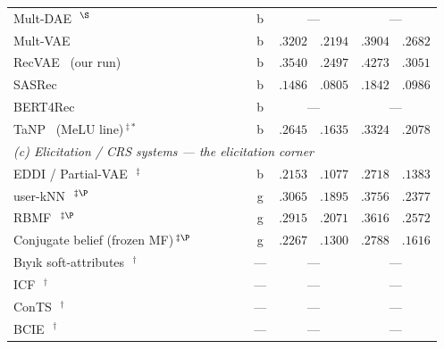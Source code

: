 \documentclass[11pt]{article}
\newcommand{\cmark}{\ding{51}}
\newcommand{\xmark}{\ding{55}}
\begin{document}
\begin{table}[!htbp]
\begin{tabular}{p{4.9cm}cccc c r@{\,/\,}l r@{\,/\,}l}
Mult-DAE~\cite{liang2018variational}\,$^{\S}$ & \cmark & \xmark & \xmark & \xmark & b & \multicolumn{2}{c}{---} & \multicolumn{2}{c}{---} \\
Mult-VAE~\cite{liang2018variational} & \cmark & \xmark & \xmark & \xmark & b & $.3202$ & $.2194$ & $.3904$ & $.2682$ \\
RecVAE~\cite{ren2020recvae} (our run) & \cmark & \xmark & \xmark & \xmark & b & $\mathbf{.3540}$ & $\mathbf{.2497}$ & $\mathbf{.4273}$ & $\mathbf{.3051}$ \\
SASRec~\cite{kang2018sasrec} & \xmark & \xmark & \xmark & \xmark & b & $.1486$ & $.0805$ & $.1842$ & $.0986$ \\
BERT4Rec~\cite{sun2019bert4rec} & \xmark & \xmark & \xmark & \xmark & b & \multicolumn{2}{c}{---} & \multicolumn{2}{c}{---} \\
TaNP~\cite{lin2021tanp} (MeLU line)\,$^{\ddagger\ast}$ & \xmark & \xmark & \xmark & \cmark & b & $.2645$ & $.1635$ & $.3324$ & $.2078$ \\
\midrule
\multicolumn{10}{l}{\emph{(c) Elicitation / CRS systems --- the elicitation corner}}\\
EDDI / Partial-VAE~\cite{ma2019eddi}\,$^{\ddagger}$ & \xmark & \xmark & \xmark & \cmark & b & $.2153$ & $.1077$ & $.2718$ & $.1383$ \\
user-kNN~\cite{golbandi2011adaptive}\,$^{\ddagger\P}$ & \xmark & \xmark & \xmark & \cmark & g & $.3065$ & $.1895$ & $.3756$ & $.2377$ \\
RBMF~\cite{liu2011wisdom,zhou2011functional}\,$^{\ddagger\P}$ & \xmark & \xmark & \xmark & \cmark & g & $.2915$ & $.2071$ & $.3616$ & $.2572$ \\
Conjugate belief (frozen MF)\,$^{\ddagger\P}$ & \xmark & \xmark & \xmark & \cmark & g & $.2267$ & $.1300$ & $.2788$ & $.1616$ \\
B\i y\i k soft-attributes~\cite{biyik2023soft}\,$^{\dagger}$ & \xmark & \xmark & \xmark & \cmark & --- & \multicolumn{2}{c}{---} & \multicolumn{2}{c}{---} \\
ICF~\cite{zhao2013interactive}\,$^{\dagger}$ & \xmark & \xmark & \xmark & \cmark & --- & \multicolumn{2}{c}{---} & \multicolumn{2}{c}{---} \\
ConTS~\cite{li2021seamlessly}\,$^{\dagger}$ & \xmark & \xmark & \xmark & \xmark & --- & \multicolumn{2}{c}{---} & \multicolumn{2}{c}{---} \\
BCIE~\cite{toroghi2023bcie}\,$^{\dagger}$ & \xmark & \xmark & \cmark & \xmark & --- & \multicolumn{2}{c}{---} & \multicolumn{2}{c}{---} \\

\end{tabular}
\end{table}
\end{document}

